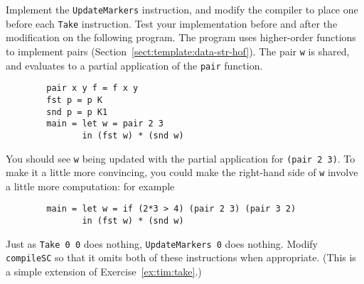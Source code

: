 \begin{exercise}
Implement the \mbox{\tt UpdateMarkers} instruction, and modify the compiler to place
one before each \mbox{\tt Take} instruction.  Test your implementation before and
after the modification on the following program.  The program
uses higher-order functions to implement pairs
(Section~\ref{sect:template:data-str-hof}).
The pair \mbox{\tt w} is shared, and evaluates to a partial application of the \mbox{\tt pair}
function.
\begin{verbatim}
        pair x y f = f x y
        fst p = p K
        snd p = p K1
        main = let w = pair 2 3
               in (fst w) * (snd w)
\end{verbatim}
You should see \mbox{\tt w} being updated with the partial application
for \mbox{\tt (pair\ 2\ 3)}.   To make it a little more convincing, you could
make the right-hand side of \mbox{\tt w} involve a little more computation: for example
\begin{verbatim}
        main = let w = if (2*3 > 4) (pair 2 3) (pair 3 2)
               in (fst w) * (snd w)
\end{verbatim}
\end{exercise}

\begin{exercise} \label{ex:tim:upd-zero}
Just as \mbox{\tt Take\ 0\ 0} does nothing, \mbox{\tt UpdateMarkers\ 0} does nothing.
Modify \mbox{\tt compileSC} so that it omits both of these instructions when
appropriate.  (This is a simple extension of Exercise~\ref{ex:tim:take}.)
\end{exercise}


